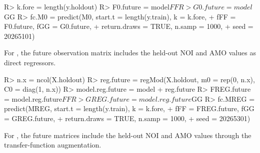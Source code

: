 \documentclass{jss}
\begin{document}
\begin{CodeChunk}
\begin{CodeInput}
R> k.fore = length(y.holdout)
R> F0.future = model$FF
R> G0.future = model$GG
R> fc.M0 = predict(M0, start.t = length(y.train), k = k.fore,
+                  fFF = F0.future, fGG = G0.future,
+                  return.draws = TRUE, n.samp = 1000,
+                  seed = 20265101)
\end{CodeInput}
\end{CodeChunk}

For , the future observation matrix includes the held-out NOI and AMO values as direct regressors.

\begin{CodeChunk}
\begin{CodeInput}
R> n.x = ncol(X.holdout)
R> reg.future = regMod(X.holdout, m0 = rep(0, n.x), C0 = diag(1, n.x))
R> model.reg.future = model + reg.future
R> FREG.future = model.reg.future$FF
R> GREG.future = model.reg.future$GG
R> fc.MREG = predict(MREG, start.t = length(y.train), k = k.fore,
+                    fFF = FREG.future, fGG = GREG.future,
+                    return.draws = TRUE, n.samp = 1000,
+                    seed = 20265301)
\end{CodeInput}
\end{CodeChunk}

For , the future matrices include the held-out NOI and AMO values through the transfer-function augmentation.

\begin{CodeChunk}
\end{CodeChunk}
\end{document}
